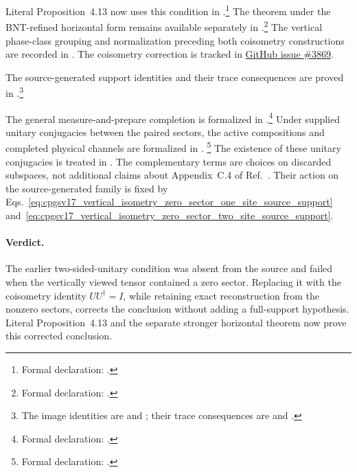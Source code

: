 \documentclass{article}
\begin{document}
Literal Proposition~4.13 now uses this condition in
.\footnote{Formal
declaration: .}
The theorem under the BNT-refined horizontal form remains available
separately in
.\footnote{Formal declaration:
.}
The vertical phase-class grouping and normalization preceding both coisometry
constructions are recorded in
. The coisometry correction is tracked
in \href{https://github.com/LionSR/TNLean/issues/3869}{GitHub issue \#3869}.

The source-generated support identities and their trace consequences are
proved in
.\footnote{The image
identities are
 and
; their
trace consequences are
 and
.}

The general measure-and-prepare completion is formalized in
.\footnote{Formal declaration:
.}
Under supplied unitary conjugacies between the paired sectors, the active
compositions and completed physical channels are formalized in
.%
\footnote{Formal declaration:
.}
The existence of these unitary conjugacies is treated in
. The complementary terms
are choices on discarded subspaces, not additional claims about Appendix~C.4
of Ref.~\cite{Cirac2016MPDO_arXiv}. Their action on the source-generated family
is fixed by
Eqs.~\ref{eq:cpgsv17_vertical_isometry_zero_sector_one_site_source_support}
and~\ref{eq:cpgsv17_vertical_isometry_zero_sector_two_site_source_support}.

\paragraph{Verdict.}
The earlier two-sided-unitary condition was absent from the source and failed
when the vertically viewed tensor contained a zero sector. Replacing it with
the coisometry identity $UU^\dagger=I$, while retaining exact reconstruction
from the nonzero sectors, corrects the conclusion without adding a full-support
hypothesis. Literal Proposition~4.13 and the separate stronger horizontal
theorem now prove this corrected conclusion.
\end{document}
